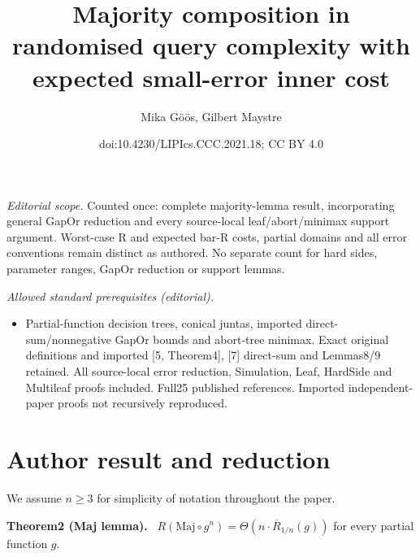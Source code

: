 \documentclass[10pt,a4paper]{article}
\title{Majority composition in randomised query complexity with expected small-error inner cost}
\author{Mika Göös, Gilbert Maystre}
\date{doi:10.4230/LIPIcs.CCC.2021.18; CC BY 4.0}
\newenvironment{authorclaim}[1]{\par\medskip\noindent\textbf{#1.}\ }{\par\medskip}
\begin{document}
\maketitle
\noindent\textit{Editorial scope.} Counted once: complete majority-lemma result, incorporating general GapOr reduction and every source-local leaf/abort/minimax support argument. Worst-case R and expected bar-R costs, partial domains and all error conventions remain distinct as authored. No separate count for hard sides, parameter ranges, GapOr reduction or support lemmas.\par\medskip
\noindent\textit{Allowed standard prerequisites (editorial).}\begin{itemize}
\item Partial-function decision trees, conical juntas, imported direct-sum/nonnegative GapOr bounds and abort-tree minimax. Exact original definitions and imported [5, Theorem4], [7] direct-sum and Lemmas8/9 retained. All source-local error reduction, Simulation, Leaf, HardSide and Multileaf proofs included. Full25 published references. Imported independent-paper proofs not recursively reproduced.
\end{itemize}\medskip
\section*{Author result and reduction}
We assume $n\ge3$ for simplicity of notation throughout the paper.

\begin{authorclaim}{Theorem2 (Maj lemma)}
$R(\mathrm{Maj}\circ g^n)=\Theta(n\cdot\overline R_{1/n}(g))$ for every partial function $g$.
\end{authorclaim}
\end{document}
